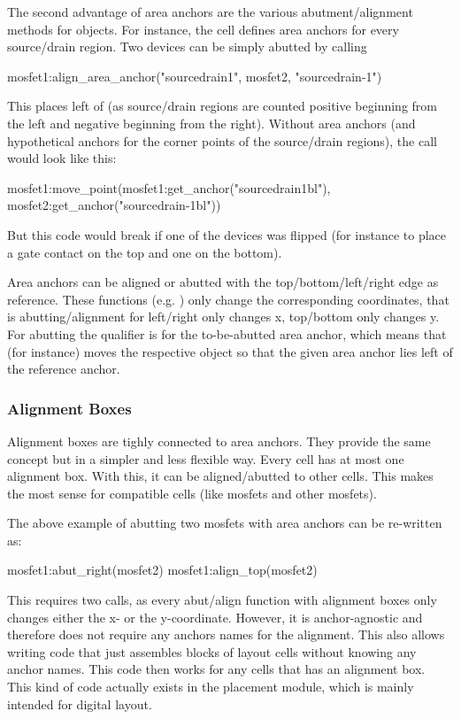 The second advantage of area anchors are the various abutment/alignment methods for objects.
For instance, the cell  defines area anchors for every source/drain region.
Two devices can be simply abutted by calling
\begin{lualisting}
    mosfet1:align_area_anchor("sourcedrain1", mosfet2, "sourcedrain-1")
\end{lualisting}
This places  left of  (as source/drain regions are counted positive beginning from the left and negative beginning from the right).
Without area anchors (and hypothetical anchors for the corner points of the source/drain regions), the call would look like this:
\begin{lualisting}
    mosfet1:move_point(mosfet1:get_anchor("sourcedrain1bl"), mosfet2:get_anchor("sourcedrain-1bl"))
\end{lualisting}
But this code would break if one of the devices was flipped (for instance to place a gate contact on the top and one on the bottom).

Area anchors can be aligned or abutted with the top/bottom/left/right edge as reference.
These functions (e.g.
) only change the corresponding coordinates, that is abutting/alignment for left/right only changes x, top/bottom only changes y.
For abutting the qualifier is for the to-be-abutted area anchor, which means that (for instance)  moves the respective object so that the given area anchor lies left of the reference anchor.

\subsubsection{Alignment Boxes}
Alignment boxes are tighly connected to area anchors.
They provide the same concept but in a simpler and less flexible way.
Every cell has at most one alignment box.
With this, it can be aligned/abutted to other cells.
This makes the most sense for compatible cells (like mosfets and other mosfets).

The above example of abutting two mosfets with area anchors can be re-written as:
\begin{lualisting}
    mosfet1:abut_right(mosfet2)
    mosfet1:align_top(mosfet2)
\end{lualisting}
This requires two calls, as every abut/align function with alignment boxes only changes either the x- or the y-coordinate.
However, it is anchor-agnostic and therefore does not require any anchors names for the alignment.
This also allows writing code that just assembles blocks of layout cells without knowing any anchor names.
This code then works for any cells that has an alignment box.
This kind of code actually exists in the placement module, which is mainly intended for digital layout.

